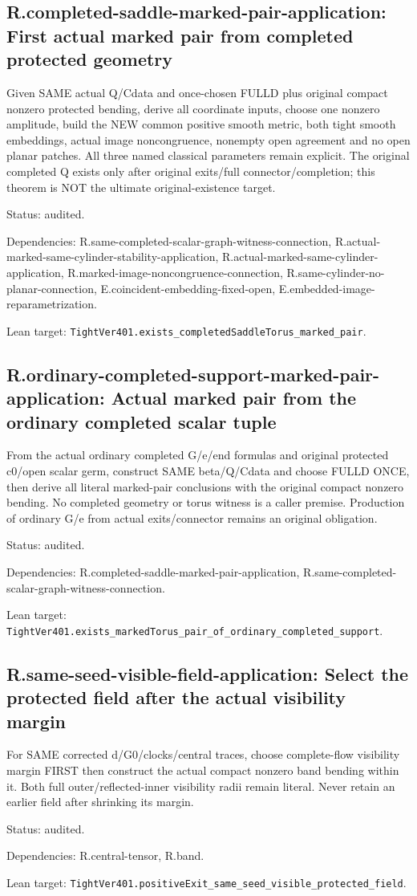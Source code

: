 \documentclass{article}
\begin{document}
\subsection*{R.completed-saddle-marked-pair-application: First actual marked pair from completed protected geometry}
Given SAME actual Q/Cdata and once-chosen FULLD plus original compact nonzero protected bending, derive all coordinate inputs, choose one nonzero amplitude, build the NEW common positive smooth metric, both tight smooth embeddings, actual image noncongruence, nonempty open agreement and no open planar patches. All three named classical parameters remain explicit. The original completed Q exists only after original exits/full connector/completion; this theorem is NOT the ultimate original-existence target.
\par Status: audited.
\par Dependencies: R.same-completed-scalar-graph-witness-connection, R.actual-marked-same-cylinder-stability-application, R.actual-marked-same-cylinder-application, R.marked-image-noncongruence-connection, R.same-cylinder-no-planar-connection, E.coincident-embedding-fixed-open, E.embedded-image-reparametrization.
\par Lean target: \texttt{TightVer401.exists\_completedSaddleTorus\_marked\_pair}.
\subsection*{R.ordinary-completed-support-marked-pair-application: Actual marked pair from the ordinary completed scalar tuple}
From the actual ordinary completed G/e/end formulas and original protected c0/open scalar germ, construct SAME beta/Q/Cdata and choose FULLD ONCE, then derive all literal marked-pair conclusions with the original compact nonzero bending. No completed geometry or torus witness is a caller premise. Production of ordinary G/e from actual exits/connector remains an original obligation.
\par Status: audited.
\par Dependencies: R.completed-saddle-marked-pair-application, R.same-completed-scalar-graph-witness-connection.
\par Lean target: \texttt{TightVer401.exists\_markedTorus\_pair\_of\_ordinary\_completed\_support}.
\subsection*{R.same-seed-visible-field-application: Select the protected field after the actual visibility margin}
For SAME corrected d/G0/clocks/central traces, choose complete-flow visibility margin FIRST then construct the actual compact nonzero band bending within it. Both full outer/reflected-inner visibility radii remain literal. Never retain an earlier field after shrinking its margin.
\par Status: audited.
\par Dependencies: R.central-tensor, R.band.
\par Lean target: \texttt{TightVer401.positiveExit\_same\_seed\_visible\_protected\_field}.
\end{document}
